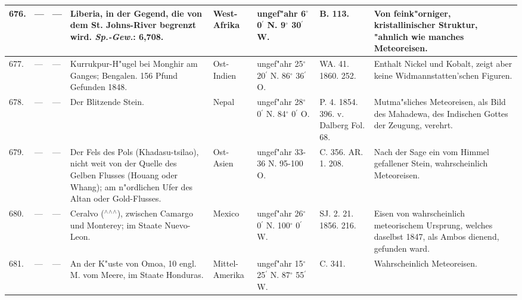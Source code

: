 \documentclass[a4paper, 8pt, oneside, polutonikogreek, german]{article}
\begin{document}
\begin{center}
\begin{longtable}{| p{5mm} | p{3mm} | p{15mm} | p{25mm} | p{20mm} | p{14mm} | p{17mm} | p{24mm} |}
        676. & --- & --- & Liberia, in der Gegend, die von dem St. Johns-River begrenzt wird. \emph{Sp.-Gew.}: 6,708. & West-Afrika & ungef"ahr 6$^\circ$ 0$^\prime$ N. 9$^\circ$ 30$^\prime$ W. & B. 113. & Von feink"orniger, kristallinischer Struktur, "ahnlich wie manches Meteoreisen. \\ \hline
        677. & --- & --- & Kurrukpur-H"ugel bei Monghir am Ganges; Bengalen. 156 Pfund Gefunden 1848. & Ost-Indien & ungef"ahr 25$^\circ$ 20$^\prime$ N. 86$^\circ$ 36$^\prime$ O. & WA. 41. 1860. 252. & Enthalt Nickel und Kobalt, zeigt aber keine Widmannstatten'schen Figuren. \\ \hline
        678. & --- & --- & Der Blitzende Stein. & Nepal & ungef"ahr 28$^\circ$ 0$^\prime$ N. 84$^\circ$ 0$^\prime$ O. & P. 4. 1854. 396. v. Dalberg Fol. 68. & Mutma"sliches Meteoreisen, als Bild des Mahadewa, des Indischen Gottes der Zeugung, verehrt. \\ \hline
        679. & --- & --- & Der Fels des Pols (Khadasu-tsilao), nicht weit von der Quelle des Gelben Flusses (Houang oder Whang); am n"ordlichen Ufer des Altan oder Gold-Flusses. & Ost-Asien & ungef"ahr 33-36 N. 95-100 O. & C. 356. AR. 1. 208. & Nach der Sage ein vom Himmel gefallener Stein, wahrscheinlich Meteoreisen. \\ \hline
        680. & --- & --- & Ceralvo ($^\wedge$$^\wedge$$^\wedge$), zwischen Camargo und Monterey; im Staate Nuevo-Leon. & Mexico & ungef"ahr 26$^\circ$ 0$^\prime$ N. 100$^\circ$ 0$^\prime$ W. & SJ. 2. 21. 1856. 216. & Eisen von wahrscheinlich meteorischem Ursprung, welches daselbst 1847, als Ambos dienend, gefunden ward. \\ \hline
        681. & --- & --- & An der K"uste von Omoa, 10 engl. M. vom Meere, im Staate Honduras. & Mittel-Amerika & ungef"ahr 15$^\circ$ 25$^\prime$ N. 87$^\circ$ 55$^\prime$ W. & C. 341. & Wahrscheinlich Meteoreisen. \\ \hline
    \end{longtable}
\end{center}
\clearpage
\end{document}
